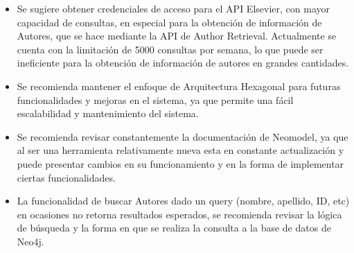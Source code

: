 \begin{itemize}
    \item Se sugiere obtener credenciales de acceso para el API Elsevier, con mayor capacidad de consultas, en especial para la obtención de información de Autores, que se hace mediante la API de Author Retrieval. Actualmente se cuenta con la limitación de 5000 consultas por semana, lo que puede ser ineficiente para la obtención de información de autores en grandes cantidades.
    \item Se recomienda mantener el enfoque de Arquitectura Hexagonal para futuras funcionalidades y mejoras en el sistema, ya que permite una fácil escalabilidad y mantenimiento del sistema.
    \item Se recomienda revisar constantemente la documentación de Neomodel, ya que al ser una herramienta relativamente nueva esta en constante actualización  y puede presentar cambios en su funcionamiento y en la forma de implementar ciertas funcionalidades.
    \item La funcionalidad de buscar Autores dado un query (nombre, apellido, ID, etc) en ocasiones no retorna resultados esperados, se recomienda revisar la lógica de búsqueda y la forma en que se realiza la consulta a la base de datos de Neo4j.
\end{itemize}